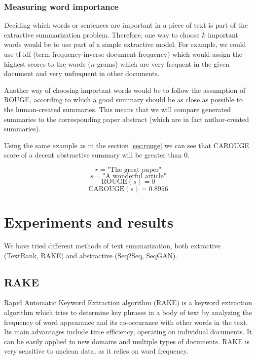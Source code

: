 \documentclass[sigplan]{acmart}
\begin{document}
\subsubsection{Measuring word importance}
\label{sec:importance}

Deciding which words or sentences are important in a piece of text is part of the extractive summarization problem. Therefore, one way to choose $k$ important words would be to use part of a simple extractive model. For example, we could use tf-idf (term frequency-inverse document frequency) which would assign the highest scores to the words ($n$-grams) which are very frequent in the given document and very unfrequent in other documents.

Another way of choosing important words would be to follow the assumption of ROUGE, according to which a good summary should be as close as possible to the human-created summaries. This means that we will compare generated summaries to the corresponding paper abstract (which are in fact author-created summaries).

Using the same example as in the section \ref{sec:rouge} we can see that CAROUGE score of a decent abstractive summary will be greater than 0.

\[ r = \text{"The great paper"} \]
\[ s = \text{"A wonderful article"} \]
\[ \text{ROUGE}(s) = 0 \]
\[ \text{CAROUGE}(s) = 0.8956 \]

\section{Experiments and results}

We have tried different methods of text summarization, both extractive (TextRank, RAKE) and abstractive (Seq2Seq, SeqGAN).

\subsection{RAKE}

Rapid Automatic Keyword Extraction algorithm (RAKE)\cite{rose-10} is a keyword extraction algorithm which tries to determine key phrases in a body of text by analyzing the frequency of word appearance and its co-occurance with other words in the text. Its main advantages include time efficiency, operating on individual documents. It can be easily applied to new domains and multiple types of documents. RAKE is very sensitive to unclean data, as it relies on word frequency.
\end{document}
